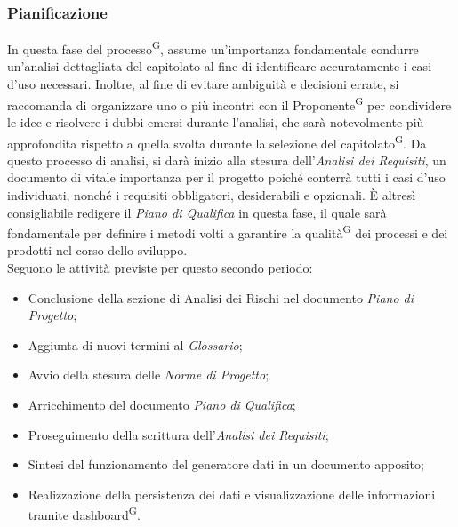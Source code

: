 \documentclass[8pt]{article}
\newcommand{\glossterm}[1]{#1\textsuperscript{G}} %
\begin{document}
\subsubsection{Pianificazione}
In questa fase del \glossterm{processo}, assume un'importanza fondamentale condurre un'analisi dettagliata del capitolato al fine di identificare accuratamente i casi d'uso necessari. Inoltre, al fine di evitare ambiguità e decisioni errate, si raccomanda di organizzare uno o più incontri con il \glossterm{Proponente} per condividere le idee e risolvere i dubbi emersi durante l'analisi, che sarà notevolmente più approfondita rispetto a quella svolta durante la selezione del \glossterm{capitolato}. Da questo processo di analisi, si darà inizio alla stesura dell'\textit{Analisi dei Requisiti}, un documento di vitale importanza per il progetto poiché conterrà tutti i casi d'uso individuati, nonché i requisiti obbligatori, desiderabili e opzionali.
È altresì consigliabile redigere il \textit{Piano di Qualifica} in questa fase, il quale sarà fondamentale per definire i metodi volti a garantire la \glossterm{qualità} dei processi e dei prodotti nel corso dello sviluppo. \\ Seguono le attività previste per questo secondo periodo:
\begin{itemize}
\setlength{\itemsep}{0em}
    \item Conclusione della sezione di Analisi dei Rischi nel documento \textit{Piano di Progetto};
    \item Aggiunta di nuovi termini al \textit{Glossario};
    \item Avvio della stesura delle \textit{Norme di Progetto};
    \item Arricchimento del documento \textit{Piano di Qualifica};
    \item Proseguimento della scrittura dell'\textit{Analisi dei Requisiti};
    \item Sintesi del funzionamento del generatore dati in un documento apposito;
    \item Realizzazione della persistenza dei dati e visualizzazione delle informazioni tramite \glossterm{dashboard}.
\end{itemize}
\end{document}
